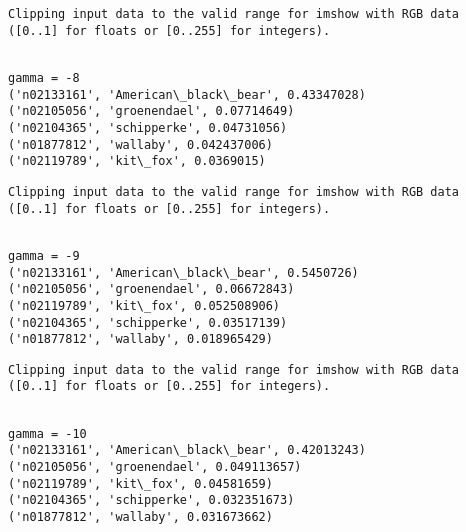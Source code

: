 \documentclass[11pt]{article}
\begin{document}
    \begin{Verbatim}[commandchars=\\\{\}]
Clipping input data to the valid range for imshow with RGB data ([0..1] for floats or [0..255] for integers).

    \end{Verbatim}

    \begin{Verbatim}[commandchars=\\\{\}]

gamma = -8
('n02133161', 'American\_black\_bear', 0.43347028)
('n02105056', 'groenendael', 0.07714649)
('n02104365', 'schipperke', 0.04731056)
('n01877812', 'wallaby', 0.042437006)
('n02119789', 'kit\_fox', 0.0369015)

    \end{Verbatim}

    \begin{Verbatim}[commandchars=\\\{\}]
Clipping input data to the valid range for imshow with RGB data ([0..1] for floats or [0..255] for integers).

    \end{Verbatim}

    \begin{Verbatim}[commandchars=\\\{\}]

gamma = -9
('n02133161', 'American\_black\_bear', 0.5450726)
('n02105056', 'groenendael', 0.06672843)
('n02119789', 'kit\_fox', 0.052508906)
('n02104365', 'schipperke', 0.03517139)
('n01877812', 'wallaby', 0.018965429)

    \end{Verbatim}

    \begin{Verbatim}[commandchars=\\\{\}]
Clipping input data to the valid range for imshow with RGB data ([0..1] for floats or [0..255] for integers).

    \end{Verbatim}

    \begin{Verbatim}[commandchars=\\\{\}]

gamma = -10
('n02133161', 'American\_black\_bear', 0.42013243)
('n02105056', 'groenendael', 0.049113657)
('n02119789', 'kit\_fox', 0.04581659)
('n02104365', 'schipperke', 0.032351673)
('n01877812', 'wallaby', 0.031673662)

    \end{Verbatim}
\end{document}
